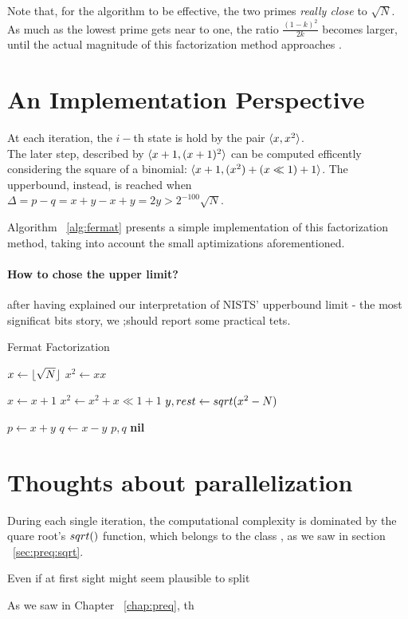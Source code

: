 \begin{remark}
  Note that, for the algorithm to be effective, the two primes
  \emph{really close} to $\sqrt{N}$. As much as the lowest prime gets near to
  one, the ratio $\frac{(1-k)^2}{2k}$ becomes larger, until the actual magnitude
  of this factorization method approaches .
\end{remark}

\section{An Implementation Perspective}

At each iteration, the $i-$th state is hold by the pair $\langle x, x^2\rangle$.\\
The later step, described by $\langle x+1, (x+1)^2\rangle$ can be computed efficently
considering the square of a binomial: $\langle x+1, (x^2) + (x \ll 1) + 1\rangle$.
The upperbound, instead, is reached when
$ \Delta = p - q  = x + y - x + y = 2y > 2^{-100}\sqrt{N}$.

Algorithm ~\ref{alg:fermat} presents a simple implementation of this
factorization method, taking into account the small aptimizations
aforementioned.

\paragraph{How to chose the upper limit?}  after having explained our interpretation
of NISTS' upperbound limit - the most significat bits story, we ;should report
some practical tets.

\begin{algorithm}
  \caption{Fermat Factorization \label{alg:fermat}}
  \begin{algorithmic}[1]
    \State $x \gets \lfloor\sqrt{N}\rfloor$
    \State $x^2 \gets xx$

    \Repeat
    \State $x \gets x+1$
    \State $x^2 \gets x^2 + x \ll 1 + 1$
    \State $y, rest \gets sqrt(x^2 - N)$

    \State $p \gets x+y$
    \State $q \gets x-y$
    \State \Return $p, q$
    \Else
    \State \Return \textbf{nil}
    \EndIf
    \end{algorithmic}
\end{algorithm}


\section{Thoughts about parallelization}

During each single iteration, the computational complexity is dominated by the
quare root's $\dsqrt$ function, which belongs to the class
, as we saw in section ~\ref{sec:preq:sqrt}.

Even if at first sight might seem plausible to split

As we saw in Chapter ~\ref{chap:preq}, th
